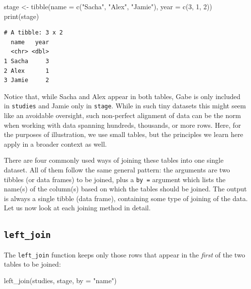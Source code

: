\documentclass[
  letterpaper,
  DIV=11,
  numbers=noendperiod]{scrreprt}
\newenvironment{Shaded}{\begin{snugshade}}{\end{snugshade}}
\newcommand{\AttributeTok}[1]{\textcolor[rgb]{0.40,0.45,0.13}{#1}}
\newcommand{\DecValTok}[1]{\textcolor[rgb]{0.68,0.00,0.00}{#1}}
\newcommand{\FunctionTok}[1]{\textcolor[rgb]{0.28,0.35,0.67}{#1}}
\newcommand{\NormalTok}[1]{\textcolor[rgb]{0.00,0.23,0.31}{#1}}
\newcommand{\OtherTok}[1]{\textcolor[rgb]{0.00,0.23,0.31}{#1}}
\newcommand{\StringTok}[1]{\textcolor[rgb]{0.13,0.47,0.30}{#1}}
\begin{document}
\begin{Shaded}
\begin{Highlighting}[]
\NormalTok{stage }\OtherTok{\textless{}{-}} \FunctionTok{tibble}\NormalTok{(}\AttributeTok{name =} \FunctionTok{c}\NormalTok{(}\StringTok{"Sacha"}\NormalTok{, }\StringTok{"Alex"}\NormalTok{, }\StringTok{"Jamie"}\NormalTok{),}
                \AttributeTok{year =} \FunctionTok{c}\NormalTok{(}\DecValTok{3}\NormalTok{, }\DecValTok{1}\NormalTok{, }\DecValTok{2}\NormalTok{))}
\FunctionTok{print}\NormalTok{(stage)}
\end{Highlighting}
\end{Shaded}

\begin{verbatim}
# A tibble: 3 x 2
  name   year
  <chr> <dbl>
1 Sacha     3
2 Alex      1
3 Jamie     2
\end{verbatim}

Notice that, while Sacha and Alex appear in both tables, Gabe is only
included in \texttt{studies} and Jamie only in \texttt{stage}. While in
such tiny datasets this might seem like an avoidable oversight, such
non-perfect alignment of data can be the norm when working with data
spanning hundreds, thousands, or more rows. Here, for the purposes of
illustration, we use small tables, but the principles we learn here
apply in a broader context as well.

There are four commonly used ways of joining these tables into one
single dataset. All of them follow the same general pattern: the
arguments are two tibbles (or data frames) to be joined, plus a
\texttt{by\ =} argument which lists the name(s) of the column(s) based
on which the tables should be joined. The output is always a single
tibble (data frame), containing some type of joining of the data. Let us
now look at each joining method in detail.

\hypertarget{left_join}{%
\subsection{\texorpdfstring{\texttt{left\_join}}{left\_join}}\label{left_join}}

The \texttt{left\_join} function keeps only those rows that appear in
the \emph{first} of the two tables to be joined:

\begin{Shaded}
\begin{Highlighting}[]
\FunctionTok{left\_join}\NormalTok{(studies, stage, }\AttributeTok{by =} \StringTok{"name"}\NormalTok{)}
\end{Highlighting}
\end{Shaded}
\end{document}
